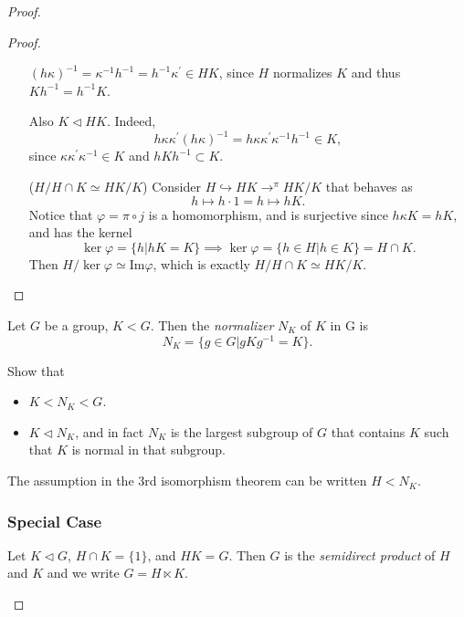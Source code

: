 \begin{proof}
\begin{proof}
\begin{itemize}
{       $(h \kappa)^{-1} = \kappa^{-1} h^{-1} = h^{-1} \kappa^\prime \in HK$, since
       $H$ normalizes $K$ and thus $K h^{-1} = h^{-1} K$.

       Also $K \triangleleft HK$. Indeed,
       $$
       h \kappa \kappa^\prime (h \kappa)^{-1}
     = h \kappa \kappa^\prime \kappa^{-1} h^{-1} \in K,
       $$
       since $\kappa \kappa^\prime \kappa^{-1} \in K$ and
       $h K h^{-1} \subset K$.
       }
       \item[($H / H \cap K \simeq HK / K$)]{
             Consider $H \hookrightarrow HK \to^{\pi} HK / K$ that behaves as
             $$
             h \mapsto h \cdot 1 = h \mapsto h K.
             $$
             Notice that $\varphi = \pi \circ j$ is a homomorphism, and is
             surjective since $h \kappa K = h K$, and has the kernel
             $$
             \ker \varphi = \{ h | hK = K \} \implies
             \ker \varphi = \{ h \in H | h \in K \} = H \cap K.
             $$
             Then $H / \ker \varphi \simeq \mathrm{Im} \varphi$, which
             is exactly
             $H / H \cap K \simeq HK / K$.
            }
\end{itemize}
\end{proof}

\begin{defn}[Normalizer]
Let $G$ be a group, $K < G$. Then the \emph{normalizer}
$N_K$ of $K$ in G is
$$
N_K = \{ g \in G | g K g^{-1} = K \}.
$$
\end{defn}

\begin{exer}
Show that
\begin{itemize}
  \item{$K < N_K < G$.}
  \item{$K \triangleleft N_K$, and in fact $N_K$ is the largest
      subgroup of $G$ that contains $K$ such that $K$ is normal in
      that subgroup.}
\end{itemize}

\end{exer}

\begin{remark}
The assumption in the 3rd isomorphism theorem can be written $H < N_K$.
\end{remark}

\subsubsection{Special Case}
\begin{defn}
Let $K \triangleleft G$, $H \cap K = \{ 1 \}$, and $HK = G$.
Then $G$ is the \emph{semidirect product} of $H$ and $K$ and we write
$G = H \ltimes K$.
\end{defn}



\end{proof}
